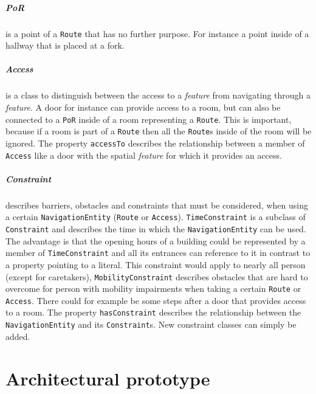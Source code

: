 \documentclass[draft,final]{vutinfth} %
\begin{document}
\subparagraph{PoR} is a point of a \texttt{Route} that has no further purpose. For instance a point inside of a hallway that is placed at a fork.

\subparagraph{Access} is a class to distinguish between the access to a \textit{feature} from navigating through a \textit{feature}. A door for instance can provide access to a room, but can also be connected to a \texttt{PoR} inside of a room representing a \texttt{Route}. This is important, because if a room is part of a \texttt{Route} then all the \texttt{Route}s inside of the room will be ignored. The property \texttt{accessTo} describes the relationship between a member of \texttt{Access} like a door with the spatial \textit{feature} for which it provides an access. 

\subparagraph{Constraint} describes barriers, obstacles and constraints that must be considered, when using a certain \texttt{NavigationEntity} (\texttt{Route} or \texttt{Access}). \texttt{TimeConstraint} is a subclass of \texttt{Constraint} and describes the time in which the \texttt{NavigationEntity} can be used. The advantage is that the opening hours of a building could be represented by a member of \texttt{TimeConstraint} and all its entrances can reference to it in contrast to a property pointing to a literal. This constraint would apply to nearly all person (except for caretakers), \texttt{MobilityConstraint} describes obstacles that are hard to overcome for person with mobility impairments when taking a certain \texttt{Route} or \texttt{Access}. There could for example be some steps after a door that provides access to a room. The property \texttt{hasConstraint} describes the relationship between the \texttt{NavigationEntity} and its \texttt{Constraint}s. New constraint classes can simply be added.

\section{Architectural prototype}
\label{solution-architectural-prototype}
\end{document}
